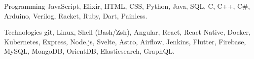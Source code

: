 

\begin{cvskills}

  \cvskill
    {Programming} %
    {JavaScript, Elixir, HTML, CSS, Python, Java, SQL, C, C++, C\#,  Arduino, Verilog, Racket, Ruby, Dart, Painless.} %

  \cvskill
    {Technologies} %
    {git, Linux, Shell (Bash/Zsh), Angular, React, React Native, Docker, Kubernetes, Express, Node.js, Svelte, Astro, Airflow, Jenkins, Flutter, Firebase, MySQL, MongoDB, OrientDB, Elasticsearch, GraphQL.} %


\end{cvskills}
